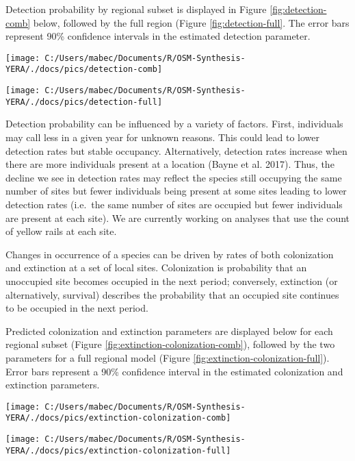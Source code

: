 \documentclass[11pt,]{article}
\begin{document}
Detection probability by regional subset is displayed in Figure
\ref{fig:detection-comb} below, followed by the full region (Figure
\ref{fig:detection-full}. The error bars represent 90\% confidence
intervals in the estimated detection parameter.

\begin{center}\texttt{[image: C:/Users/mabec/Documents/R/OSM-Synthesis-YERA/./docs/pics/detection-comb]} \end{center}

\begin{center}\texttt{[image: C:/Users/mabec/Documents/R/OSM-Synthesis-YERA/./docs/pics/detection-full]} \end{center}

Detection probability can be influenced by a variety of factors. First,
individuals may call less in a given year for unknown reasons. This
could lead to lower detection rates but stable occupancy. Alternatively,
detection rates increase when there are more individuals present at a
location (Bayne et al. 2017). Thus, the decline we see in detection
rates may reflect the species still occupying the same number of sites
but fewer individuals being present at some sites leading to lower
detection rates (i.e.~the same number of sites are occupied but fewer
individuals are present at each site). We are currently working on
analyses that use the count of yellow rails at each site.

Changes in occurrence of a species can be driven by rates of both
colonization and extinction at a set of local sites. Colonization is
probability that an unoccupied site becomes occupied in the next period;
conversely, extinction (or alternatively, survival) describes the
probability that an occupied site continues to be occupied in the next
period.

Predicted colonization and extinction parameters are displayed below for
each regional subset (Figure \ref{fig:extinction-colonization-comb}),
followed by the two parameters for a full regional model (Figure
\ref{fig:extinction-colonization-full}). Error bars represent a 90\%
confidence interval in the estimated colonization and extinction
parameters.

\begin{center}\texttt{[image: C:/Users/mabec/Documents/R/OSM-Synthesis-YERA/./docs/pics/extinction-colonization-comb]} \end{center}

\begin{center}\texttt{[image: C:/Users/mabec/Documents/R/OSM-Synthesis-YERA/./docs/pics/extinction-colonization-full]} \end{center}
\end{document}
